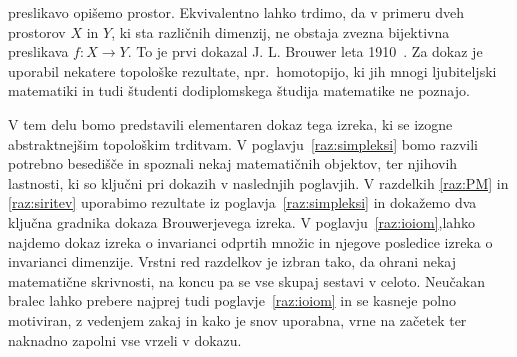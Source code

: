 \documentclass[mat1]{fmfdelo}
\newcommand{\0}{\underline{0}}
\begin{document}
preslikavo opišemo prostor. Ekvivalentno lahko trdimo, da v primeru dveh prostorov $X$ in $Y$, ki sta različnih dimenzij, ne obstaja zvezna bijektivna preslikava $f : X \to Y$. To je prvi dokazal J. L. Brouwer leta 1910~\cite[str.\ 208]{Gouvea2011}. Za dokaz je uporabil nekatere topološke rezultate, npr.\ homotopijo, ki jih mnogi ljubiteljski matematiki in tudi študenti dodiplomskega študija matematike ne poznajo. 

V tem delu bomo predstavili elementaren dokaz tega izreka, ki se izogne abstraktnejšim topološkim trditvam. V poglavju~\ref{raz:simpleksi} bomo razvili potrebno besedišče in spoznali nekaj matematičnih objektov, ter njihovih lastnosti, ki so ključni pri dokazih v naslednjih poglavjih.  V razdelkih \ref{raz:PM} in \ref{raz:siritev} uporabimo rezultate iz poglavja~\ref{raz:simpleksi} in dokažemo dva ključna gradnika dokaza Brouwerjevega izreka. V poglavju~\ref{raz:ioiom},lahko najdemo dokaz izreka o invarianci odprtih množic in njegove posledice izreka o invarianci dimenzije. Vrstni red razdelkov je izbran tako, da ohrani nekaj matematične skrivnosti, na koncu pa se vse skupaj sestavi v celoto. Neučakan bralec lahko prebere najprej tudi poglavje~\ref{raz:ioiom} in se kasneje polno motiviran, z vedenjem zakaj in kako je snov uporabna, vrne na začetek ter naknadno zapolni vse vrzeli v dokazu.


\end{document}
